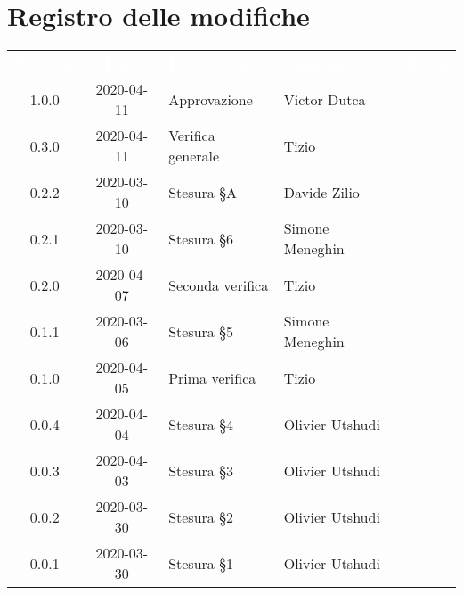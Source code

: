 \section*{Registro delle modifiche}
{
	\centering
	\begin{longtable}{ c c  C{4cm}  C{4cm}  C{3cm} }
		\textcolor{white}{\textbf{Versione}} & \textcolor{white}{\textbf{Data}} & \textcolor{white}{\textbf{Descrizione}} & \textcolor{white}{\textbf{Nominativo}} & \textcolor{white}{\textbf{Ruolo}}\\		
		1.0.0 & 2020-04-11   & Approvazione & Victor Dutca &\RdP{} \\
		0.3.0 & 2020-04-11   & Verifica generale & Tizio &\ver{} \\
		0.2.2 & 2020-03-10 & Stesura \S A & Davide Zilio &\adm{} \\
		0.2.1 & 2020-03-10 & Stesura \S 6 & Simone Meneghin &\adm{} \\
		0.2.0 & 2020-04-07   & Seconda verifica & Tizio &\ver{} \\
		0.1.1 & 2020-03-06 & Stesura \S 5  & Simone Meneghin &\adm{} \\
		0.1.0 & 2020-04-05   & Prima verifica & Tizio &\ver{} \\
		0.0.4 & 2020-04-04 & Stesura \S 4  & Olivier Utshudi &\adm{}\\	
		0.0.3 & 2020-04-03 & Stesura \S 3  & Olivier Utshudi &\adm{}\\	
		0.0.2 & 2020-03-30 & Stesura \S 2  & Olivier Utshudi &\adm{}\\	
		0.0.1 & 2020-03-30 & Stesura \S 1  & Olivier Utshudi &\adm{}\\		
	\end{longtable}
} 
